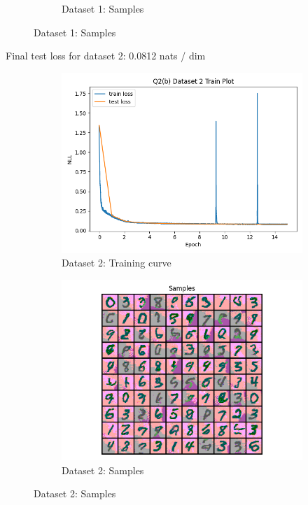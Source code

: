 \documentclass{article}
\begin{document}
\begin{enumerate}[(a)]
\begin{figure}[H]
\begin{subfigure}{0.45\textwidth}
        \caption{Dataset 1: Samples}
    \end{subfigure}
\end{figure}
Final test loss for dataset 2: 0.0812 nats / dim
\begin{figure}[H]
    \centering
    \begin{subfigure}{0.45\textwidth}
        \centering
        \includegraphics[width=\textwidth]{figures/q2_b_dset2_train_plot.png}
        \caption{Dataset 2: Training curve}
    \end{subfigure}
    \hspace{0.2in}
    \begin{subfigure}{0.45\textwidth}
        \centering
        \includegraphics[width=\textwidth]{figures/q2_b_dset2_samples.png}
        \caption{Dataset 2: Samples}
    \end{subfigure}
\end{figure}
\end{enumerate}
\end{document}
